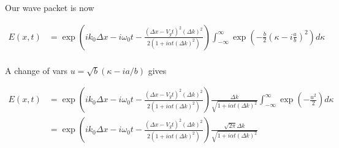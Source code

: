 \documentclass{article}
\newcommand{\IIinf}[0]{ \int_{-\infty}^\infty }
\begin{document}
Our wave packet is now

\begin{align*}
E(x,t) 
&= \exp\left( i k_0 \Delta x -i \omega_0 t - \frac{( \Delta x - V_g t)^2 (\Delta k)^2}{2(1 + i \alpha t (\Delta k)^2)} \right)
\IIinf 
\exp\left( - \frac{b}{2}\left( \kappa - i \frac{a}{b} \right)^2 \right) 
d\kappa \\
\end{align*}

A change of vars $u = \sqrt{b}(\kappa - ia/b)$ gives

\begin{align*}
E(x,t) 
&= \exp\left( i k_0 \Delta x -i \omega_0 t - \frac{( \Delta x - V_g t)^2 (\Delta k)^2}{2(1 + i \alpha t (\Delta k)^2)} \right)
\frac{\Delta k}{\sqrt{1 + i \alpha t (\Delta k)^2}}
\IIinf \exp\left( - \frac{u^2}{2} \right) d\kappa \\
&= \exp\left( i k_0 \Delta x -i \omega_0 t - \frac{( \Delta x - V_g t)^2 (\Delta k)^2}{2(1 + i \alpha t (\Delta k)^2)} \right)
\frac{\sqrt{2\pi}\Delta k}{\sqrt{1 + i \alpha t (\Delta k)^2}}
\end{align*}



\end{document}

